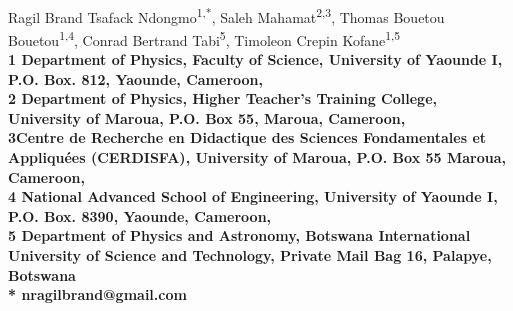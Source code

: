 \documentclass[10pt,letterpaper]{article}
\begin{document}
\vspace*{0.35in}

\begin{flushleft}
{\Large
\textbf{}
}
\newline
\\
Ragil Brand Tsafack Ndongmo\textsuperscript{1,*},
Saleh Mahamat\textsuperscript{2,3},
Thomas Bouetou Bouetou\textsuperscript{1,4},
Conrad Bertrand Tabi\textsuperscript{5},
Timoleon Crepin Kofane\textsuperscript{1,5}
\\
\bigskip
\bf{1} Department of Physics, Faculty of Science, University of Yaounde I, P.O. Box. 812, Yaounde, Cameroon,
\\

\bf{2} Department of Physics, Higher Teacher’s Training College,  University of Maroua, P.O. Box 55, Maroua, Cameroon,
\\

\bf{3}Centre de Recherche en Didactique des Sciences Fondamentales et Appliquées (CERDISFA), University of Maroua, P.O. Box 55 Maroua, Cameroon,
\\

\bf{4} National Advanced School of Engineering, University of Yaounde I, P.O. Box. 8390, Yaounde, Cameroon,
\\
\bf{5} Department of Physics and Astronomy, Botswana International University of Science and Technology, Private Mail Bag 16, Palapye, Botswana
\\
\bigskip
* nragilbrand@gmail.com

\end{flushleft}
\end{document}
